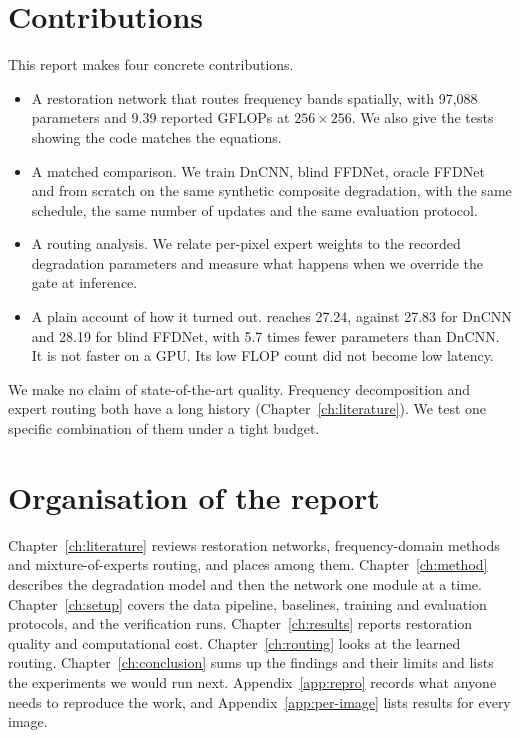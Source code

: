 \section{Contributions}\label{sec:contributions}

This report makes four concrete contributions.
\begin{itemize}
	\item A restoration network that routes frequency bands spatially, with
	97,088 parameters and 9.39 reported GFLOPs at $256\times256$. We also give
	the tests showing the code matches the equations.
	\item A matched comparison. We train DnCNN, blind FFDNet, oracle FFDNet and
	\fcsg{} from scratch on the same synthetic composite degradation, with the
	same schedule, the same number of updates and the same evaluation
	protocol.
	\item A routing analysis. We relate per-pixel expert weights to the
	recorded degradation parameters and measure what happens when we override
	the gate at inference.
	\item A plain account of how it turned out. \fcsg{} reaches 27.24\dB{},
	against 27.83\dB{} for DnCNN and 28.19\dB{} for blind FFDNet, with 5.7
	times fewer parameters than DnCNN. It is not faster on a GPU. Its low FLOP
	count did not become low latency.
\end{itemize}
We make no claim of state-of-the-art quality. Frequency decomposition and
expert routing both have a long history (Chapter~\ref{ch:literature}). We
test one specific combination of them under a tight budget.

\section{Organisation of the report}\label{sec:organisation}

Chapter~\ref{ch:literature} reviews restoration networks, frequency-domain
methods and mixture-of-experts routing, and places \fcsg{} among them.
Chapter~\ref{ch:method} describes the degradation model and then the network
one module at a time. Chapter~\ref{ch:setup} covers the data pipeline,
baselines, training and evaluation protocols, and the verification runs.
Chapter~\ref{ch:results} reports restoration quality and computational cost.
Chapter~\ref{ch:routing} looks at the learned routing.
Chapter~\ref{ch:conclusion} sums up the findings and their limits and lists
the experiments we would run next. Appendix~\ref{app:repro} records what
anyone needs to reproduce the work, and Appendix~\ref{app:per-image} lists
results for every image.
